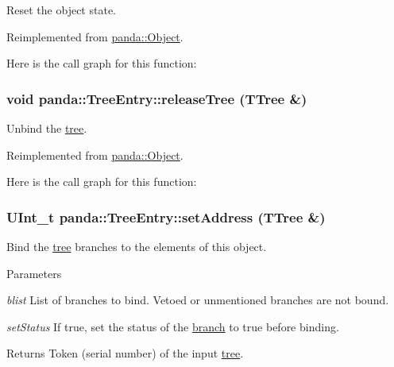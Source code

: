Reset the object state. 

Reimplemented from \hyperlink{classpanda_1_1Object_a204960e5f165a28176f9b4a42b9ea90c}{panda::Object}.

Here is the call graph for this function:\hypertarget{classpanda_1_1TreeEntry_a3d54b23c121628d22c65c26482d7cab0}{
\subsubsection[{releaseTree}]{\setlength{\rightskip}{0pt plus 5cm}void panda::TreeEntry::releaseTree (TTree \&)}}
\label{classpanda_1_1TreeEntry_a3d54b23c121628d22c65c26482d7cab0}


Unbind the \hyperlink{namespacepanda_1_1tree}{tree}. 

Reimplemented from \hyperlink{classpanda_1_1Object_aaf58438092b42a89b838ce12c6a23833}{panda::Object}.

Here is the call graph for this function:\hypertarget{classpanda_1_1TreeEntry_a693015be3e9d7c6daffe056798150455}{
\subsubsection[{setAddress}]{\setlength{\rightskip}{0pt plus 5cm}UInt\_\-t panda::TreeEntry::setAddress (TTree \&)}}
\label{classpanda_1_1TreeEntry_a693015be3e9d7c6daffe056798150455}


Bind the \hyperlink{namespacepanda_1_1tree}{tree} branches to the elements of this object. 
\begin{DoxyParams}{Parameters}
\item[{\em blist}]List of branches to bind. Vetoed or unmentioned branches are not bound. \item[{\em setStatus}]If true, set the status of the \hyperlink{namespacepanda_1_1branch}{branch} to true before binding. \end{DoxyParams}
\begin{DoxyReturn}{Returns}
Token (serial number) of the input \hyperlink{namespacepanda_1_1tree}{tree}. 
\end{DoxyReturn}


